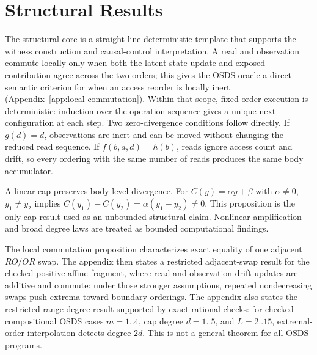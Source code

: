 \section{Structural Results}

The structural core is a straight-line deterministic template that supports the witness construction and causal-control interpretation. A read and observation commute locally only when both the latent-state update and exposed contribution agree across the two orders; this gives the OSDS oracle a direct semantic criterion for when an access reorder is locally inert (Appendix~\ref{app:local-commutation}). Within that scope, fixed-order execution is deterministic: induction over the operation sequence gives a unique next configuration at each step. Two zero-divergence conditions follow directly. If $g(d)=d$, observations are inert and can be moved without changing the reduced read sequence. If $f(b,a,d)=h(b)$, reads ignore access count and drift, so every ordering with the same number of reads produces the same body accumulator.

A linear cap preserves body-level divergence. For $C(y)=\alpha y+\beta$ with $\alpha\ne0$, $y_1\ne y_2$ implies $C(y_1)-C(y_2)=\alpha(y_1-y_2)\ne0$. This proposition is the only cap result used as an unbounded structural claim. Nonlinear amplification and broad degree laws are treated as bounded computational findings.

The local commutation proposition characterizes exact equality of one adjacent $RO/OR$ swap. The appendix then states a restricted adjacent-swap result for the checked positive affine fragment, where read and observation drift updates are additive and commute: under those stronger assumptions, repeated nondecreasing swaps push extrema toward boundary orderings. The appendix also states the restricted range-degree result supported by exact rational checks: for checked compositional OSDS cases $m=1..4$, cap degree $d=1..5$, and $L=2..15$, extremal-order interpolation detects degree $2d$. This is not a general theorem for all OSDS programs.
